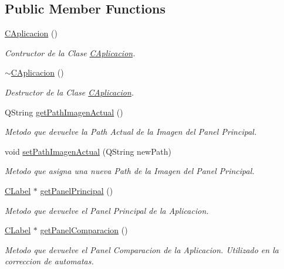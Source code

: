 \subsection*{Public Member Functions}
\begin{DoxyCompactItemize}
\item 
\hyperlink{classCAplicacion_a9b55c20439081bc5630b929b69c9fe36}{C\+Aplicacion} ()
\begin{DoxyCompactList}\small\item\em Contructor de la Clase \hyperlink{classCAplicacion}{C\+Aplicacion}. \end{DoxyCompactList}\item 
\hyperlink{classCAplicacion_a823fdda955cdfe27062d58c692b81eaf}{$\sim$\+C\+Aplicacion} ()
\begin{DoxyCompactList}\small\item\em Destructor de la Clase \hyperlink{classCAplicacion}{C\+Aplicacion}. \end{DoxyCompactList}\item 
Q\+String \hyperlink{classCAplicacion_a0cbd1aeb6fcbcc97bcb493acbaba6449}{get\+Path\+Imagen\+Actual} ()
\begin{DoxyCompactList}\small\item\em Metodo que devuelve la Path Actual de la Imagen del Panel Principal. \end{DoxyCompactList}\item 
void \hyperlink{classCAplicacion_af698484a797b35e52d029ce88390368f}{set\+Path\+Imagen\+Actual} (Q\+String new\+Path)
\begin{DoxyCompactList}\small\item\em Metodo que asigna una nueva Path de la Imagen del Panel Principal. \end{DoxyCompactList}\item 
\hyperlink{classCLabel}{C\+Label} $\ast$ \hyperlink{classCAplicacion_ae835fda5656f7ff5e6067967ed32eb09}{get\+Panel\+Principal} ()
\begin{DoxyCompactList}\small\item\em Metodo que devuelve el Panel Principal de la Aplicacion. \end{DoxyCompactList}\item 
\hyperlink{classCLabel}{C\+Label} $\ast$ \hyperlink{classCAplicacion_a8ae2ca7c0e65418c78cea44af1ba72c7}{get\+Panel\+Comparacion} ()
\begin{DoxyCompactList}\small\item\em Metodo que devuelve el Panel Comparacion de la Aplicacion. Utilizado en la correccion de automatas. \end{DoxyCompactList}\item 

\end{DoxyCompactItemize}
